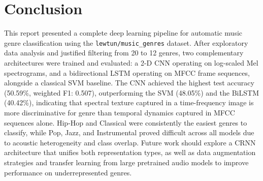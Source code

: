 \documentclass[12pt, a4paper]{article}
\begin{document}
\section{Conclusion}
\label{sec:conclusion}

This report presented a complete deep learning pipeline for automatic music genre
classification using the \texttt{lewtun/music\_genres} dataset. After exploratory data
analysis and justified filtering from 20 to 12 genres, two complementary architectures
were trained and evaluated: a 2-D CNN operating on log-scaled Mel spectrograms, and a
bidirectional LSTM operating on MFCC frame sequences, alongside a classical SVM baseline.
The CNN achieved the highest test accuracy (50.59\%, weighted F1: 0.507), outperforming
the SVM (48.05\%) and the BiLSTM (40.42\%), indicating that spectral texture captured in
a time-frequency image is more discriminative for genre than temporal dynamics captured
in MFCC sequences alone. Hip-Hop and Classical were consistently the easiest genres to
classify, while Pop, Jazz, and Instrumental proved difficult across all models due to
acoustic heterogeneity and class overlap. Future work should explore a CRNN architecture
that unifies both representation types, as well as data augmentation strategies and
transfer learning from large pretrained audio models to improve performance on
underrepresented genres.

\newpage

\end{document}
